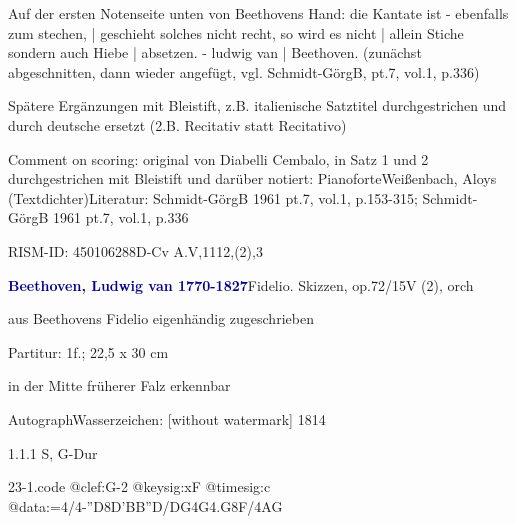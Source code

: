 \documentclass[a4paper, twocolumn, 11pt]{book}
\begin{document}
\newline %
\par Auf der ersten Notenseite unten von Beethovens Hand: {\textquotedbl}die Kantate ist - ebenfalls zum stechen, | geschieht solches nicht recht, so wird es nicht | allein Stiche sondern auch Hiebe | absetzen. - ludwig van | Beethoven.{\textquotedbl} (zunächst abgeschnitten, dann wieder angefügt, vgl. Schmidt-GörgB, pt.7, vol.1, p.336)
\par Spätere Ergänzungen mit Bleistift, z.B. italienische Satztitel durchgestrichen und durch deutsche ersetzt (2.B. {\textquotedbl}Recitativ{\textquotedbl} statt {\textquotedbl}Recitativo{\textquotedbl})
\par Comment on scoring: original von Diabelli {\textquotedbl}Cembalo{\textquotedbl}, in Satz 1 und 2 durchgestrichen mit Bleistift und darüber notiert: {\textquotedbl}Pianoforte{\textquotedbl}\newline Weißenbach, Aloys  (Textdichter)\newline Literatur: Schmidt-GörgB 1961  pt.7, vol.1, p.153-315; Schmidt-GörgB 1961  pt.7, vol.1, p.336
\par RISM-ID: 450106288\newline D-Cv  A.V,1112,(2),3
\par \vspace{16pt} \textcolor{darkblue}{\textbf{Beethoven, Ludwig van  1770-1827}}\hfillplus{[23]}\newline Fidelio. Skizzen, op.72/15\newline V (2), orch
\par \begin{itshape} aus Beethovens Fidelio eigenhändig zugeschrieben\end{itshape} 
\par \textcolor{darkblue}{}  Partitur: 1f.; 22,5 x 30 cm\newline \begin{small} in der Mitte früherer Falz erkennbar\end{small} \newline Autograph\newline Wasserzeichen: [without watermark]  1814
\par 1.1.1  S, G-Dur\newline \begin{footnotesize}  \end{footnotesize}  
\begin{filecontents*}{23-1.code}
@clef:G-2
@keysig:xF
@timesig:c
@data:=4/4-''D{8D'B}{B''D}/{DG}4G4.G8F/4AG
\end{filecontents*}
\end{document}
